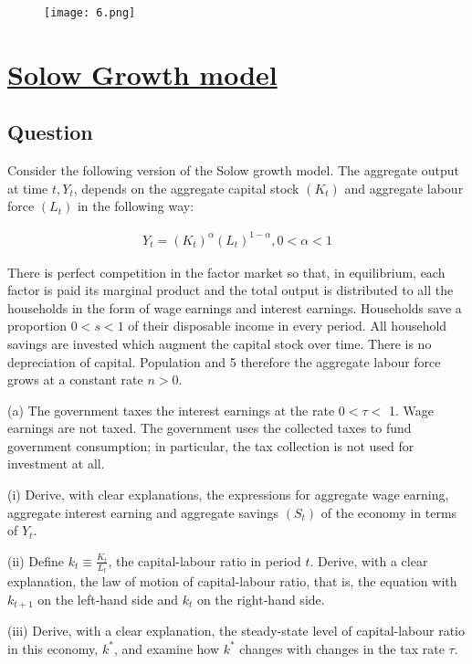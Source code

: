 \begin{figure}[H]
\centering
\texttt{[image: 6.png]}
\end{figure}

 \section{\underline{Solow Growth model} }
\subsection{Question}
Consider the following version of the Solow growth model. The aggregate output at time \(t, Y_t\), depends on the aggregate capital stock \(\left(K_t\right)\) and aggregate labour force \(\left(L_t\right)\) in the following way:

\begin{align*}
Y_t=\left(K_t\right)^\alpha\left(L_t\right)^{1-\alpha}, 0<\alpha<1
\end{align*}


There is perfect competition in the factor market so that, in equilibrium, each factor is paid its marginal product and the total output is distributed to all the households in the form of wage earnings and interest earnings. Households save a proportion \(0<s<1\) of their disposable income in every period. All household savings are invested which augment the capital stock over time. There is no depreciation of capital. Population and
5
therefore the aggregate labour force grows at a constant rate \(n>0\).

(a) The government taxes the interest earnings at the rate \(0<\tau<\) 1. Wage earnings are not taxed. The government uses the collected taxes to fund government consumption; in particular, the tax collection is not used for investment at all.

(i) Derive, with clear explanations, the expressions for aggregate wage earning, aggregate interest earning and aggregate savings \(\left(S_t\right)\) of the economy in terms of \(Y_t\).

(ii) Define \(k_t \equiv \frac{K_t}{L_t}\), the capital-labour ratio in period \(t\). Derive, with a clear explanation, the law of motion of capital-labour ratio, that is, the equation with \(k_{t+1}\) on the left-hand side and \(k_t\) on the right-hand side.

(iii) Derive, with a clear explanation, the steady-state level of capital-labour ratio in this economy, \(k^*\), and examine how \(k^*\) changes with changes in the tax rate \(\tau\).


